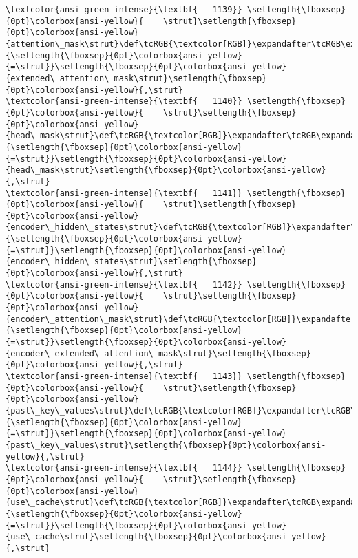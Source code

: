 \documentclass[11pt]{article}
\begin{document}
\begin{Verbatim}[commandchars=\\\{\}, frame=single, framerule=2mm, rulecolor=\color{outerrorbackground}]
\textcolor{ansi-green-intense}{\textbf{   1139}} \setlength{\fboxsep}{0pt}\colorbox{ansi-yellow}{    \strut}\setlength{\fboxsep}{0pt}\colorbox{ansi-yellow}{attention\_mask\strut}\def\tcRGB{\textcolor[RGB]}\expandafter\tcRGB\expandafter{\detokenize{98,98,98}}{\setlength{\fboxsep}{0pt}\colorbox{ansi-yellow}{=\strut}}\setlength{\fboxsep}{0pt}\colorbox{ansi-yellow}{extended\_attention\_mask\strut}\setlength{\fboxsep}{0pt}\colorbox{ansi-yellow}{,\strut}
\textcolor{ansi-green-intense}{\textbf{   1140}} \setlength{\fboxsep}{0pt}\colorbox{ansi-yellow}{    \strut}\setlength{\fboxsep}{0pt}\colorbox{ansi-yellow}{head\_mask\strut}\def\tcRGB{\textcolor[RGB]}\expandafter\tcRGB\expandafter{\detokenize{98,98,98}}{\setlength{\fboxsep}{0pt}\colorbox{ansi-yellow}{=\strut}}\setlength{\fboxsep}{0pt}\colorbox{ansi-yellow}{head\_mask\strut}\setlength{\fboxsep}{0pt}\colorbox{ansi-yellow}{,\strut}
\textcolor{ansi-green-intense}{\textbf{   1141}} \setlength{\fboxsep}{0pt}\colorbox{ansi-yellow}{    \strut}\setlength{\fboxsep}{0pt}\colorbox{ansi-yellow}{encoder\_hidden\_states\strut}\def\tcRGB{\textcolor[RGB]}\expandafter\tcRGB\expandafter{\detokenize{98,98,98}}{\setlength{\fboxsep}{0pt}\colorbox{ansi-yellow}{=\strut}}\setlength{\fboxsep}{0pt}\colorbox{ansi-yellow}{encoder\_hidden\_states\strut}\setlength{\fboxsep}{0pt}\colorbox{ansi-yellow}{,\strut}
\textcolor{ansi-green-intense}{\textbf{   1142}} \setlength{\fboxsep}{0pt}\colorbox{ansi-yellow}{    \strut}\setlength{\fboxsep}{0pt}\colorbox{ansi-yellow}{encoder\_attention\_mask\strut}\def\tcRGB{\textcolor[RGB]}\expandafter\tcRGB\expandafter{\detokenize{98,98,98}}{\setlength{\fboxsep}{0pt}\colorbox{ansi-yellow}{=\strut}}\setlength{\fboxsep}{0pt}\colorbox{ansi-yellow}{encoder\_extended\_attention\_mask\strut}\setlength{\fboxsep}{0pt}\colorbox{ansi-yellow}{,\strut}
\textcolor{ansi-green-intense}{\textbf{   1143}} \setlength{\fboxsep}{0pt}\colorbox{ansi-yellow}{    \strut}\setlength{\fboxsep}{0pt}\colorbox{ansi-yellow}{past\_key\_values\strut}\def\tcRGB{\textcolor[RGB]}\expandafter\tcRGB\expandafter{\detokenize{98,98,98}}{\setlength{\fboxsep}{0pt}\colorbox{ansi-yellow}{=\strut}}\setlength{\fboxsep}{0pt}\colorbox{ansi-yellow}{past\_key\_values\strut}\setlength{\fboxsep}{0pt}\colorbox{ansi-yellow}{,\strut}
\textcolor{ansi-green-intense}{\textbf{   1144}} \setlength{\fboxsep}{0pt}\colorbox{ansi-yellow}{    \strut}\setlength{\fboxsep}{0pt}\colorbox{ansi-yellow}{use\_cache\strut}\def\tcRGB{\textcolor[RGB]}\expandafter\tcRGB\expandafter{\detokenize{98,98,98}}{\setlength{\fboxsep}{0pt}\colorbox{ansi-yellow}{=\strut}}\setlength{\fboxsep}{0pt}\colorbox{ansi-yellow}{use\_cache\strut}\setlength{\fboxsep}{0pt}\colorbox{ansi-yellow}{,\strut}

\end{Verbatim}
\end{document}
